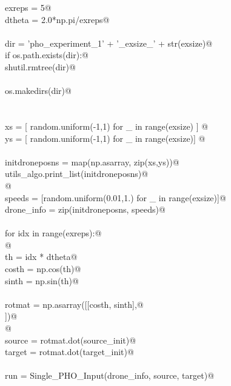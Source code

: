 \documentclass[10.0pt]{report}
\begin{document}
\begin{flushleft}
\begin{minipage}{\linewidth}
\begin{list}{}{}
\mbox{}\verb@    exreps = 5@\\
\mbox{}\verb@    dtheta = 2.0*np.pi/exreps@\\
\mbox{}\verb@@\\
\mbox{}\verb@    dir = 'pho_experiment_1' + '_exsize_' + str(exsize)@\\
\mbox{}\verb@    if os.path.exists(dir):@\\
\mbox{}\verb@       shutil.rmtree(dir)@\\
\mbox{}\verb@@\\
\mbox{}\verb@    os.makedirs(dir)@\\
\mbox{}\verb@@\\
\mbox{}\verb@@\\
\mbox{}\verb@    xs     = [ random.uniform(-1,1) for _ in range(exsize) ] @\\
\mbox{}\verb@    ys     = [ random.uniform(-1,1) for _ in range(exsize)] @\\
\mbox{}\verb@@\\
\mbox{}\verb@    initdroneposns = map(np.asarray, zip(xs,ys))@\\
\mbox{}\verb@    utils_algo.print_list(initdroneposns)@\\
\mbox{}\verb@    @\\
\mbox{}\verb@    speeds = [random.uniform(0.01,1.) for _ in range(exsize)]@\\
\mbox{}\verb@    drone_info = zip(initdroneposns, speeds)@\\
\mbox{}\verb@@\\
\mbox{}\verb@    for idx in range(exreps):@\\
\mbox{}\verb@        @\\
\mbox{}\verb@         th    = idx * dtheta@\\
\mbox{}\verb@         costh = np.cos(th)@\\
\mbox{}\verb@         sinth = np.sin(th)@\\
\mbox{}\verb@@\\
\mbox{}\verb@         rotmat = np.asarray([[costh, sinth],@\\
\mbox{}])@\\
\mbox{}\verb@   @\\
\mbox{}\verb@         source = rotmat.dot(source_init)@\\
\mbox{}\verb@         target = rotmat.dot(target_init)@\\
\mbox{}\verb@@\\
\mbox{}\verb@         run = Single_PHO_Input(drone_info, source, target)@\\

\end{list}
\end{minipage}
\end{flushleft}
\end{document}
